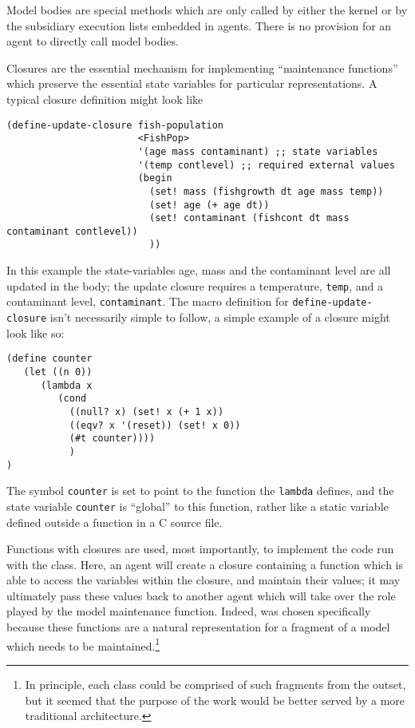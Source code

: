Model bodies are special methods which are only called by either the kernel
or by the subsidiary execution lists embedded in agents. There is no
provision for an agent to directly call model bodies.

Closures are the essential mechanism for implementing ``maintenance
functions'' which preserve the essential state variables for particular
representations.  A typical closure definition might look like
\begin{verbatim}
(define-update-closure fish-population
                       <FishPop>
                       '(age mass contaminant) ;; state variables 
                       '(temp contlevel) ;; required external values
                       (begin
                         (set! mass (fishgrowth dt age mass temp))
                         (set! age (+ age dt))
                         (set! contaminant (fishcont dt mass contaminant contlevel))
                         ))
\end{verbatim}
In this example the state-variables age, mass and the contaminant
level are all updated in the body; the update closure requires a
temperature, \texttt{temp}, and a contaminant level, \texttt{contaminant}.
The macro definition for \texttt{define-update-closure} isn't
necessarily simple to follow, a simple example of a closure might look
like so:
\begin{verbatim}
(define counter 
   (let ((n 0))
      (lambda x 
         (cond
           ((null? x) (set! x (+ 1 x))
           ((eqv? x '(reset)) (set! x 0))
           (#t counter))))
           )
)
\end{verbatim}
The symbol \texttt{counter} is set to point to the function the
\texttt{lambda} defines, and the state variable \texttt{counter} is
``global'' to this function, rather like a static variable defined
outside a function in a C source file. 
             


Functions with closures are used, most importantly, to implement the
code run with the  class. Here, an agent will
create a closure containing a function which is able to access the
variables within the closure, and maintain their values; it may
ultimately pass these values back to another agent which will take
over the role played by the model maintenance function.  Indeed,
\Scheme was chosen specifically because these functions are a natural
representation for a fragment of a model which needs to be
maintained.\footnote{In principle, each class could be comprised of such
fragments from the outset, but it seemed that the purpose of the
work would be better served by a more traditional architecture.}

